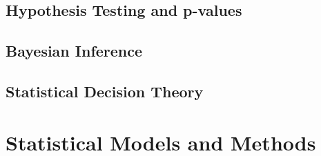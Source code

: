 \documentclass{article}
\begin{document}
\subsection{Hypothesis Testing and p-values}

\subsection{Bayesian Inference}

\subsection{Statistical Decision Theory}

\section{Statistical Models and Methods}
\end{document}
